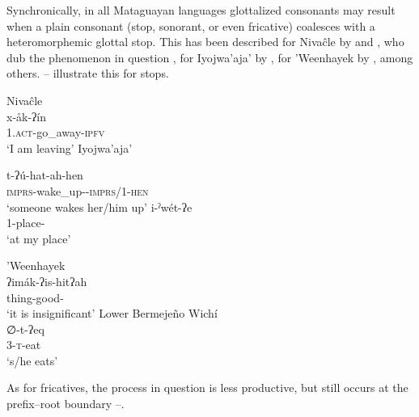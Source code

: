 Synchronically, in all Mataguayan languages glottalized consonants may result when a plain consonant (stop, sonorant, or even fricative) coalesces with a heteromorphemic glottal stop. This has been described for Nivaĉle by \citet[29]{AnG15} and \citet[57]{LC20}, who dub the phenomenon in question , for Iyojwa’aja’ by \citet[78]{JC14b}, for ’Weenhayek by \citet[30]{KC94}, among others. -- illustrate this for stops.

\ea\label{ex:obst-plus-glott:niv}
Nivaĉle \citep[29]{AnG15}\\
        \gll x-åk-ʔín~\\
                1\SG.\textsc{act}-go\_away-\textsc{ipfv}\\
                \glt `I am leaving'
\z
\ea\label{ex:obst-plus-glott:ijw}
Iyojwa’aja’ \citep[77--78]{JC14b}\\
\begin{xlist}
        \ex \gll t-ʔú-hat-ah-hen~\\
                \textsc{imprs}-wake\_up-\CAUS-\textsc{imprs}/1\PL-\textsc{hen}\\
                \glt `someone wakes her/him up'
        \ex \gll i-ˀwét-ʔe~\\
                1\SG-place-\LOC\\
                \glt `at my place'
\end{xlist}
\z
\ea\label{ex:obst-plus-glott:whk}
’Weenhayek \citep[30]{KC94}\\
        \gll ʔimák-ʔis-hitʔah~\\
                thing-good-\NEG\\
                \glt `it is insignificant'
\z
\ea\label{ex:obst-plus-glott:lbw}
Lower Bermejeño Wichí \citep[239]{VN14}\\
        \gll ∅-t-ʔeq~\\
             3-\textsc{t}-eat\\
             \glt `s/he eats'
\z

As for fricatives, the process in question is less productive, but still occurs at the prefix--root boundary --.

